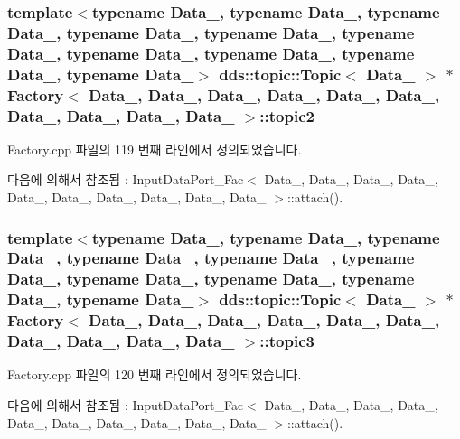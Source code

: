 \subsubsection[{\texorpdfstring{topic2}{topic2}}]{\setlength{\rightskip}{0pt plus 5cm}template$<$typename Data\+\_, typename Data\+\_, typename Data\+\_, typename Data\+\_, typename Data\+\_, typename Data\+\_, typename Data\+\_, typename Data\+\_, typename Data\+\_, typename Data\+\_$>$ dds\+::topic\+::\+Topic$<$ Data\+\_ $>$ $\ast$ {\bf Factory}$<$ Data\+\_, Data\+\_, Data\+\_, Data\+\_, Data\+\_, Data\+\_, Data\+\_, Data\+\_, Data\+\_, Data\+\_ $>$\+::topic2}\hypertarget{classFactory_ab9a453fcd33f6843819c86ffa569a46a}{}\label{classFactory_ab9a453fcd33f6843819c86ffa569a46a}


Factory.\+cpp 파일의 119 번째 라인에서 정의되었습니다.



다음에 의해서 참조됨 \+:  Input\+Data\+Port\+\_\+\+Fac$<$ Data\+\_, Data\+\_, Data\+\_, Data\+\_, Data\+\_, Data\+\_, Data\+\_, Data\+\_, Data\+\_, Data\+\_ $>$\+::attach().

\subsubsection[{\texorpdfstring{topic3}{topic3}}]{\setlength{\rightskip}{0pt plus 5cm}template$<$typename Data\+\_, typename Data\+\_, typename Data\+\_, typename Data\+\_, typename Data\+\_, typename Data\+\_, typename Data\+\_, typename Data\+\_, typename Data\+\_, typename Data\+\_$>$ dds\+::topic\+::\+Topic$<$ Data\+\_ $>$ $\ast$ {\bf Factory}$<$ Data\+\_, Data\+\_, Data\+\_, Data\+\_, Data\+\_, Data\+\_, Data\+\_, Data\+\_, Data\+\_, Data\+\_ $>$\+::topic3}\hypertarget{classFactory_a54fef646f78840de831f09c0f4f065c9}{}\label{classFactory_a54fef646f78840de831f09c0f4f065c9}


Factory.\+cpp 파일의 120 번째 라인에서 정의되었습니다.



다음에 의해서 참조됨 \+:  Input\+Data\+Port\+\_\+\+Fac$<$ Data\+\_, Data\+\_, Data\+\_, Data\+\_, Data\+\_, Data\+\_, Data\+\_, Data\+\_, Data\+\_, Data\+\_ $>$\+::attach().

